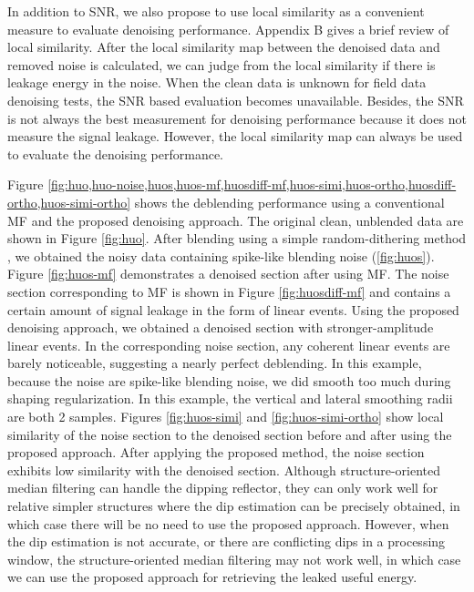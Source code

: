In addition to SNR, we also propose to use local similarity \cite[]{fomel2007localattr} as a convenient measure to evaluate denoising performance. Appendix B gives a brief review of local similarity. After the local similarity map between the denoised data and removed noise is calculated, we can judge from the local similarity if there is leakage energy in the noise. %
When the clean data is unknown for field data denoising tests, the SNR based evaluation becomes unavailable. Besides, the SNR is not always the best measurement for denoising performance because it does not measure the signal leakage. However, the local similarity map can always be used to evaluate the denoising performance.

Figure \ref{fig:huo,huo-noise,huos,huos-mf,huosdiff-mf,huos-simi,huos-ortho,huosdiff-ortho,huos-simi-ortho} shows the deblending performance using a conventional MF and the proposed denoising approach. The original clean, unblended data are shown in Figure \ref{fig:huo}. After blending using a simple random-dithering method \cite[]{yangkang20142}, we obtained the noisy data containing spike-like blending noise (\ref{fig:huos}). Figure \ref{fig:huos-mf} demonstrates a denoised section after using MF. The noise section corresponding to MF is shown in Figure \ref{fig:huosdiff-mf} and contains a certain amount of signal leakage in the form of linear events. Using the proposed denoising approach, we obtained a denoised section with stronger-amplitude linear events. In the corresponding noise section, any coherent linear events are barely noticeable, suggesting a nearly perfect deblending. In this example, because the noise are spike-like blending noise, we did smooth too much during shaping regularization. In this example, the vertical and lateral smoothing radii are both 2 samples. Figures \ref{fig:huos-simi} and \ref{fig:huos-simi-ortho} show local similarity of the noise section to the denoised section before and after using the proposed approach. After applying the proposed method, the noise section exhibits low similarity with the denoised section. Although structure-oriented median filtering can handle the dipping reflector, they can only work well for relative simpler structures where the dip estimation can be precisely obtained, in which case there will be no need to use the proposed approach. However, when the dip estimation is not accurate, or there are conflicting dips in a processing window, the structure-oriented median filtering may not work well, in which case we can use the proposed approach for retrieving the leaked useful energy.

